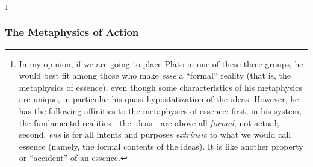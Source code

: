 %
\footnote{In my opinion, if we are going to place Plato in one of these three groups, he would best fit among those who make \emph{esse} a “formal” reality (that is, the metaphysics of essence), even though some characteristics of his metaphysics are unique, in particular his quasi-hypostatization of the ideas. However, he has the following affinities to the metaphysics of essence: first, in his system, the fundamental realities—the ideas—are above all \emph{formal}, not actual; second, \emph{ens} is for all intents and purposes \emph{extrinsic} to what we would call essence (namely, the formal contents of the ideas). It is like another property or “accident” of an essence.}

\subsubsection{The Metaphysics of Action}


